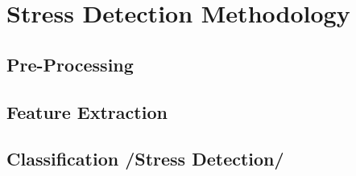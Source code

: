\chapter{Stress Detection Methodology}

\section{Pre-Processing }
\section{Feature Extraction}
\section{Classification /Stress Detection/}
